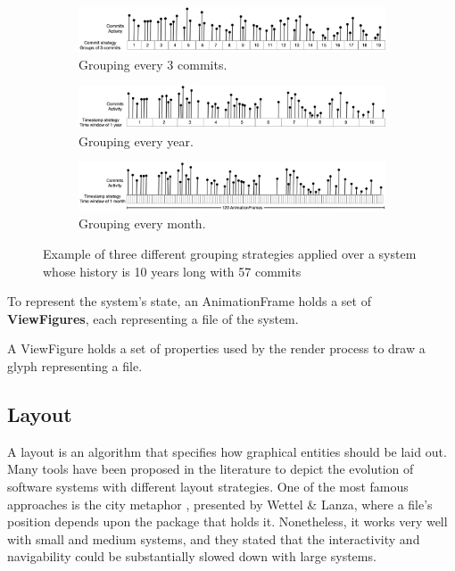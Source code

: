\begin{figure}
    \begin{center}
        \begin{subfigure}{1\textwidth}
            \includegraphics[width=\linewidth]{TimeWindow1.jpg}
            \caption{Grouping every 3 commits.} 
            \label{fig:TimeWindow1}
        \end{subfigure}
        \begin{subfigure}{1\textwidth}
            \includegraphics[width=\linewidth]{TimeWindow2.jpg}
            \caption{Grouping every year.} 
            \label{fig:TimeWindow2}
        \end{subfigure}
        \begin{subfigure}{1\textwidth}
            \includegraphics[width=\linewidth]{TimeWindow3.jpg}
            \caption{Grouping every month.}
            \label{fig:TimeWindow3}
        \end{subfigure}
        \caption[Example of three different grouping strategies]{Example of three different grouping strategies applied over a system whose history is 10 years long with 57 commits}
        \label{fig:TimeWindowExamples}
    \end{center}
\end{figure}



To represent the system's state, an AnimationFrame holds a set of \textbf{ViewFigures}, each representing a file of the system.

A ViewFigure holds a set of properties used by the render process to draw a glyph representing a file. 

\subsection*{Layout}
A layout is an algorithm that specifies how graphical entities should be laid out. 
Many tools have been proposed in the literature to depict the evolution of software systems with different layout strategies. 
One of the most famous approaches is the city metaphor \cite{Wettel2007}, presented by Wettel \& Lanza, where a file's position depends upon the package that holds it. 
Nonetheless, it works very well with small and medium systems, and they stated that the interactivity and navigability could be substantially slowed down with large systems.


